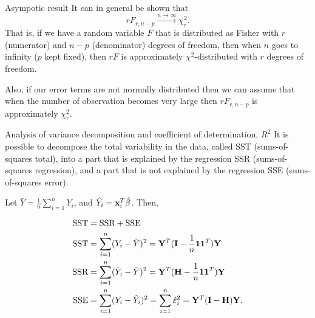 \documentclass[
  ignorenonframetext,
]{beamer}
\begin{document}
\begin{frame}{Asympotic result}
\label{asympotic-result}
It can in general be shown that
\[r F_{r,n-p}\stackrel{n\rightarrow \infty}{\longrightarrow} \chi^2_r.\]
That is, if we have a random variable \(F\) that is distributed as
Fisher with \(r\) (numerator) and \(n-p\) (denominator) degrees of
freedom, then when \(n\) goes to infinity (\(p\) kept fixed), then
\(rF\) is approximately \(\chi^2\)-distributed with \(r\) degrees of
freedom.

Also, if our error terms are not normally distributed then we can assume
that when the number of observation becomes very large then
\(rF_{r,n-p}\) is approximately \(\chi^2_r\).
\end{frame}

\begin{frame}{Analysis of variance decomposition and coefficient of
determination, \(R^2\)}
\label{analysis-of-variance-decomposition-and-coefficient-of-determination-r2}
It is possible to decompose the total variability in the data, called
SST (sums-of-squares total), into a part that is explained by the
regression SSR (sums-of-squares regression), and a part that is not
explained by the regression SSE (sums-of-squares error).

Let \(\bar{Y}=\frac{1}{n}\sum_{i=1}^n Y_i\), and
\(\hat{Y}_i={\bf x}_i^T\hat{\beta}\). Then,

\begin{align*} 
\text{SST}&=\text{SSR}+\text{SSE}\\
\text{SST}&=\sum_{i=1}^n (Y_i-\bar{Y})^2={\bf Y}^T({\bf I}-\frac{1}{n}{\bf 1 1}^T){\bf Y}\\
\text{SSR}&=\sum_{i=1}^n (\hat{Y}_i-\bar{Y})^2={\bf Y}^T({\bf H}-\frac{1}{n}{\bf 1 1}^T){\bf Y}\\
\text{SSE}&=\sum_{i=1}^n (Y_i-\hat{Y}_i)^2=\sum_{i=1}^n \hat{\varepsilon}_i^2={\bf Y}^T({\bf I}-{\bf H}){\bf Y}.\\
\end{align*}
\end{frame}
\end{document}
